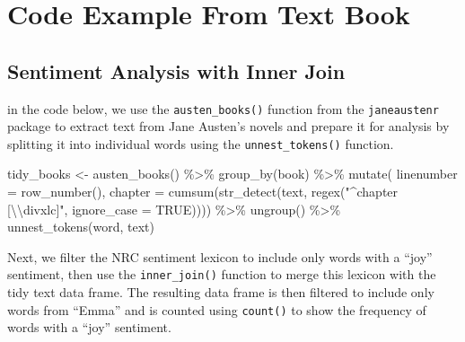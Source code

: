 \documentclass[
]{article}
\newenvironment{Shaded}{\begin{snugshade}}{\end{snugshade}}
\newcommand{\AttributeTok}[1]{\textcolor[rgb]{0.77,0.63,0.00}{#1}}
\newcommand{\ConstantTok}[1]{\textcolor[rgb]{0.00,0.00,0.00}{#1}}
\newcommand{\FunctionTok}[1]{\textcolor[rgb]{0.00,0.00,0.00}{#1}}
\newcommand{\NormalTok}[1]{#1}
\newcommand{\OtherTok}[1]{\textcolor[rgb]{0.56,0.35,0.01}{#1}}
\newcommand{\SpecialCharTok}[1]{\textcolor[rgb]{0.00,0.00,0.00}{#1}}
\newcommand{\StringTok}[1]{\textcolor[rgb]{0.31,0.60,0.02}{#1}}
\begin{document}
\hypertarget{code-example-from-text-book}{%
\section{Code Example From Text
Book}\label{code-example-from-text-book}}

\hypertarget{sentiment-analysis-with-inner-join}{%
\subsection{Sentiment Analysis with Inner
Join}\label{sentiment-analysis-with-inner-join}}

in the code below, we use the \texttt{austen\_books()} function from the
\texttt{janeaustenr} package to extract text from Jane Austen's novels
and prepare it for analysis by splitting it into individual words using
the \texttt{unnest\_tokens()} function.

\begin{Shaded}
\begin{Highlighting}[]
\NormalTok{tidy\_books }\OtherTok{\textless{}{-}} \FunctionTok{austen\_books}\NormalTok{() }\SpecialCharTok{\%\textgreater{}\%}
  \FunctionTok{group\_by}\NormalTok{(book) }\SpecialCharTok{\%\textgreater{}\%}
  \FunctionTok{mutate}\NormalTok{(}
    \AttributeTok{linenumber =} \FunctionTok{row\_number}\NormalTok{(),}
    \AttributeTok{chapter =} \FunctionTok{cumsum}\NormalTok{(}\FunctionTok{str\_detect}\NormalTok{(text, }
                                \FunctionTok{regex}\NormalTok{(}\StringTok{"\^{}chapter [}\SpecialCharTok{\textbackslash{}\textbackslash{}}\StringTok{divxlc]"}\NormalTok{, }
                                      \AttributeTok{ignore\_case =} \ConstantTok{TRUE}\NormalTok{)))) }\SpecialCharTok{\%\textgreater{}\%}
  \FunctionTok{ungroup}\NormalTok{() }\SpecialCharTok{\%\textgreater{}\%}
  \FunctionTok{unnest\_tokens}\NormalTok{(word, text)}
\end{Highlighting}
\end{Shaded}

Next, we filter the NRC sentiment lexicon to include only words with a
``joy'' sentiment, then use the \texttt{inner\_join()} function to merge
this lexicon with the tidy text data frame. The resulting data frame is
then filtered to include only words from ``Emma'' and is counted using
\texttt{count()} to show the frequency of words with a ``joy''
sentiment.
\end{document}

